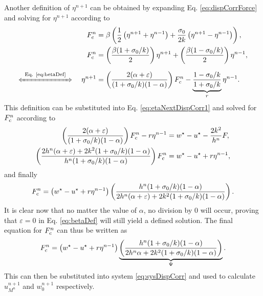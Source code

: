 Another definition of $\eta^{n+1}$ can be obtained by expanding Eq. \eqref{eq:dispCorrForce} and solving for $\eta^{n+1}$ according to
\begin{align}
    F_\ctxt^n &= \beta\left(\frac{1}{2}\left(\eta^{n+1}+\eta^{n-1}\right) + \frac{\sigma_0}{2k}\left(\eta^{n+1}-\eta^{n-1}\right)\right)\nonumber,\\
    F_\ctxt^n&= \left(\frac{\beta (1 + \sigma_0/k)}{2}\right)\eta^{n+1} + \left(\frac{\beta (1 - \sigma_0/k)}{2}\right) \eta^{n-1}\nonumber,\\
    \xLeftrightarrow{\mystrut\ \text{Eq. \eqref{eq:betaDef}}\ } \quad \eta^{n+1} &= \left(\frac{2
    (\alpha +\varepsilon)}{(1+\sigma_0/k)(1-\alpha)}\right)F_\ctxt^n - \underbrace{\frac{1-\sigma_0/k}{1+\sigma_0/k}}_{r}\eta^{n-1}.\label{eq:etaNextDispCorr2}
\end{align}
This definition can be substituted into Eq. \eqref{eq:etaNextDispCorr1} and solved for $F_{\text{c}}^n$ according to 
\begin{align*}
    \left(\frac{2
    (\alpha +\varepsilon)}{(1+\sigma_0/k)(1-\alpha)}\right)F_{\text{c}}^n - r \eta^{n-1} &= w^\star - u^\star- \frac{2k^2}{h^n}F,\\
    \left(\frac{2h^n
    (\alpha +\varepsilon) + 2k^2(1+\sigma_0/k)(1-\alpha)}{h^n(1+\sigma_0/k)(1-\alpha)}\right)F_{\text{c}}^n &= w^\star - u^\star+r\eta^{n-1},
\end{align*}
and finally 
\begin{equation*}
    F_{\text{c}}^n = \left(w^\star - u^\star+r\eta^{n-1}\right)\left(\frac{h^n(1+\sigma_0/k)(1-\alpha)}{2h^n (\alpha +\varepsilon) + 2k^2(1+\sigma_0/k)(1-\alpha)}\right).
\end{equation*}
It is clear now that no matter the value of $\alpha$, no division by 0 will occur, proving that $\varepsilon = 0$ in Eq. \eqref{eq:betaDef} will still yield a defined solution. The final equation for $F_{\text{c}}^n$ can thus be written as
\begin{equation}\label{eq:finalForce}
    F_{\text{c}}^n = \left(w^\star - u^\star+r\eta^{n-1}\right)\underbrace{\left(\frac{h^n(1+\sigma_0/k)(1-\alpha)}{2h^n\alpha + 2k^2(1+\sigma_0/k)(1-\alpha)}\right)}_{\Psi}.
\end{equation}
This can then be substituted into system \eqref{eq:sysDispCorr} and used to calculate $u_{M^n}^{n+1}$ and $w_0^{n+1}$ respectively. 

